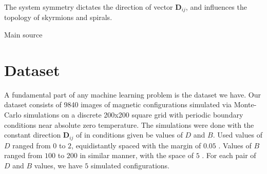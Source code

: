 The system symmetry dictates the direction of vector $\bm{D}_{ij}$, and influences the topology of skyrmions and spirals.

Main source \cite{li2023magnetic}

\section{Dataset}


A fundamental part of any machine learning problem is the dataset we have. Our dataset consists of 9840 images of magnetic configurations simulated via Monte-Carlo simulations on a discrete 200x200 square grid with periodic boundary conditions near absolute zero temperature. The simulations were done with the constant direction $\bm{D}_{ij}$ of in conditions given be values of $D$ and $B$. Used values of $D$ ranged from $0$ to $2$, equidistantly spaced with the margin of $0.05$ . Values of $B$ ranged from $100$ to $200$ in similar manner, with the space of $5$ . For each pair of $D$ and $B$ values, we have $5$ simulated configurations.





